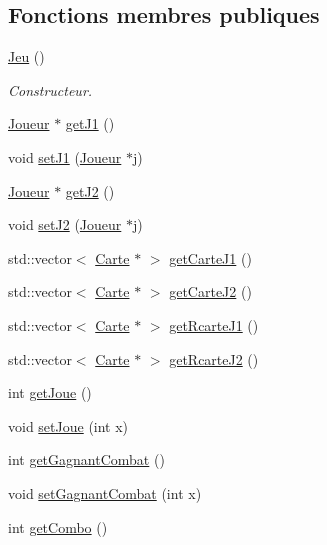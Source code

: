 \subsection*{Fonctions membres publiques}
\begin{DoxyCompactItemize}
\item 
\hyperlink{class_jeu_acc5795ee00edf75516d3dfe65be3e6d6}{Jeu} ()
\begin{DoxyCompactList}\small\item\em Constructeur. \end{DoxyCompactList}\item 
\hyperlink{class_joueur}{Joueur} $\ast$ \hyperlink{class_jeu_a56ed2a2cef42566e3c157cc11588e2ae}{get\-J1} ()
\item 
void \hyperlink{class_jeu_a74110004db819646a40323b1daa2c249}{set\-J1} (\hyperlink{class_joueur}{Joueur} $\ast$j)
\item 
\hyperlink{class_joueur}{Joueur} $\ast$ \hyperlink{class_jeu_afd1e01e7843d24cee637b41ffdfec9ad}{get\-J2} ()
\item 
void \hyperlink{class_jeu_a37c63b56c95a83753c6f9521e1d355b4}{set\-J2} (\hyperlink{class_joueur}{Joueur} $\ast$j)
\item 
std\-::vector$<$ \hyperlink{class_carte}{Carte} $\ast$ $>$ \hyperlink{class_jeu_ab6e4e2510694715b5a97fdeb73387cc6}{get\-Carte\-J1} ()
\item 
std\-::vector$<$ \hyperlink{class_carte}{Carte} $\ast$ $>$ \hyperlink{class_jeu_a86c6895722d29422a5bfe449ec2887f9}{get\-Carte\-J2} ()
\item 
std\-::vector$<$ \hyperlink{class_carte}{Carte} $\ast$ $>$ \hyperlink{class_jeu_ac4c93bb98ab4e39bfb6f433a68892c56}{get\-Rcarte\-J1} ()
\item 
std\-::vector$<$ \hyperlink{class_carte}{Carte} $\ast$ $>$ \hyperlink{class_jeu_ad1639e6ab51ce0704f20b4b389888e4a}{get\-Rcarte\-J2} ()
\item 
int \hyperlink{class_jeu_afded871bc0c3104ce1f0196ab4449663}{get\-Joue} ()
\item 
void \hyperlink{class_jeu_a3c7a41b6e9acc74ab8286adc0f6c99fc}{set\-Joue} (int x)
\item 
int \hyperlink{class_jeu_aedcf65c5f258409cd5539c7f3132b7b8}{get\-Gagnant\-Combat} ()
\item 
void \hyperlink{class_jeu_a02280609f3dc7843923f8de198d42654}{set\-Gagnant\-Combat} (int x)
\item 
int \hyperlink{class_jeu_a1bc939a24ccb8035cab265d022e909e3}{get\-Combo} ()
\item 

\end{DoxyCompactItemize}
